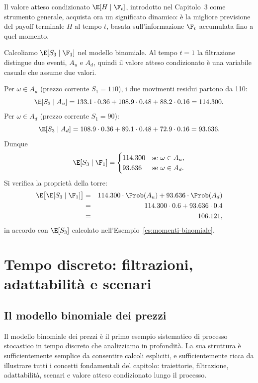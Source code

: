 \noindent
Il valore atteso condizionato $\E[H\mid\F_t]$, introdotto nel
Capitolo~3 come strumento generale, acquista ora un significato
dinamico: \`{e} la migliore previsione del payoff terminale $H$ al
tempo $t$, basata sull'informazione $\F_t$ accumulata fino a quel
momento.

\begin{example}
\label{es:cond-filtrazione}
Calcoliamo $\E[S_3\mid\F_1]$ nel modello binomiale. Al tempo $t=1$ la
filtrazione distingue due eventi, $A_u$ e $A_d$, quindi il valore
atteso condizionato \`{e} una variabile casuale che assume due valori.

Per $\omega\in A_u$ (prezzo corrente $S_1=110$), i due movimenti
residui partono da 110:
\[
\E[S_3\mid A_u]=133.1\cdot 0.36+108.9\cdot 0.48+88.2\cdot 0.16
=114.300.
\]
Per $\omega\in A_d$ (prezzo corrente $S_1=90$):
\[
\E[S_3\mid A_d]=108.9\cdot 0.36+89.1\cdot 0.48+72.9\cdot 0.16
=93.636.
\]
Dunque
\[
\E[S_3\mid\F_1]=\begin{cases}
114.300 & \text{se }\omega\in A_u,\\
93.636 & \text{se }\omega\in A_d.
\end{cases}
\]
Si verifica la propriet\`{a} della torre:
\begin{eqnarray*}
\E\bigl[\E[S_3\mid\F_1]\bigr]
&=& 114.300\cdot\Prob(A_u)+93.636\cdot\Prob(A_d)\\
&=& 114.300\cdot 0.6+93.636\cdot 0.4\\
&=& 106.121,
\end{eqnarray*}
in accordo con $\E[S_3]$ calcolato
nell'Esempio~\ref{es:momenti-binomiale}.
\end{example}

\section{Tempo discreto: filtrazioni, adattabilit\`{a} e scenari}
\label{sec:discreto}

\subsection{Il modello binomiale dei prezzi}

Il modello binomiale dei prezzi \`{e} il primo esempio sistematico di
processo stocastico in tempo discreto che analizziamo in profondit\`{a}.
La sua struttura \`{e} sufficientemente semplice da consentire calcoli
espliciti, e sufficientemente ricca da illustrare tutti i concetti
fondamentali del capitolo: traiettorie, filtrazione, adattabilit\`{a},
scenari e valore atteso condizionato lungo il processo.

